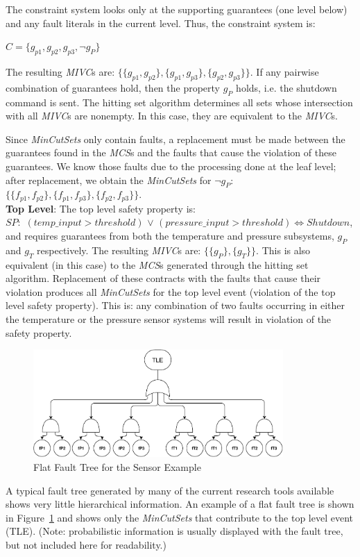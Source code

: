 The constraint system looks only at the supporting guarantees (one level below) and any fault literals in the current level. Thus, the constraint system is: 
\begin{center}
    $C = \{g_{p1}, g_{p2}, g_{p3}, \neg g_P\}$
\end{center}

The resulting \textit{MIVC}s are: $\{\{g_{p1}, g_{p2}\}, \{g_{p1}, g_{p3}\}, \{g_{p2}, g_{p3}\}\}$. If any pairwise combination of guarantees hold, then the property $g_P$ holds, i.e. the shutdown command is sent. The hitting set algorithm determines all sets whose intersection with all \textit{MIVC}s are nonempty. In this case, they are equivalent to the \textit{MIVC}s. 

Since \textit{MinCutSets} only contain faults, a replacement must be made between the guarantees found in the \textit{MCS}s and the faults that cause the violation of these guarantees. We know those faults due to the processing done at the leaf level; after replacement, we obtain the \textit{MinCutSets} for $\neg g_P$: $\{\{f_{p1}, f_{p2}\}, \{f_{p1}, f_{p3}\}, \{f_{p2}, f_{p3}\}\}$.\\

\textbf{Top Level}: The top level safety property is:\\ $SP : $  $(temp\_input > threshold)$ $\lor$ $(pressure\_input > threshold) \iff Shutdown$, and requires guarantees from both the temperature and pressure subsystems, $g_P$ and $g_T$ respectively. The resulting \textit{MIVC}s are: $\{\{g_P\}, \{g_T\}\}$. This is also equivalent (in this case) to the \textit{MCS}s generated through the hitting set algorithm. Replacement of these contracts with the faults that cause their violation produces all \textit{MinCutSets} for the top level event (violation of the top level safety property). This is: any combination of two faults occurring in either the temperature or the pressure sensor systems will result in violation of the safety property. 

\begin{figure}[h!]
	\centering
	\includegraphics[trim=0 0 0 0,clip,width=0.85\textwidth]{images/flatFT.pdf}
	\caption{Flat Fault Tree for the Sensor Example}
	\label{fig:flatFT}
\end{figure}
\newpage
A typical fault tree generated by many of the current research tools available shows very little hierarchical information. An example of a flat fault tree is shown in Figure~\ref{fig:flatFT} and shows only the \textit{MinCutSets} that contribute to the top level event (TLE). (Note: probabilistic information is usually displayed with the fault tree, but not included here for readability.)

